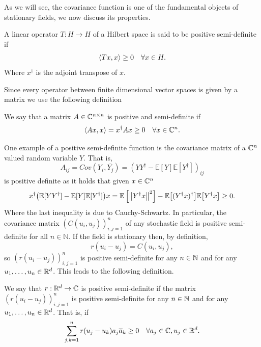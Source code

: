 \documentclass[
    a4paper,
    DIV=14,
    abstract=true,
    numbers=noenddot
]{scrartcl}
\begin{document}
As we will see, the covariance function is one of the fundamental objects of stationary fields, we now discuss its properties.
\begin{definition}
	A linear operator $T: H\to H$ of a Hilbert space is said to be positive semi-definite if
	\begin{equation*}
		\left\langle Tx,x\right\rangle\geq 0 \quad\forall x \in H.
	\end{equation*}
	Where $x^\dagger$ is the adjoint transpose of $x$.
\end{definition}
Since every operator between finite dimensional vector spaces is given by a matrix we use the following definition
\begin{definition}
	We say that a matrix $A \in \mathbb{C}^{n\times n}$ is positive and semi-definite if
	\begin{equation*}
		\left\langle Ax,x\right\rangle=x^\dagger Ax\geq 0\quad\forall x \in \mathbb{C}^n.
	\end{equation*}
\end{definition}
One example of a positive semi-definite function is the covariance matrix of a $\mathbb{C}^n$ valued random variable  $Y$. That is, $$A_{ij}=Cov(Y_i,\overline{Y_j})=(YY^\dagger-\mathbb{E}[Y]\mathbb{E}[Y^\dagger])_{ij}$$ is positive definite as it holds that given $x\in \mathbb{C}^n$
\begin{equation*}
	x^\dagger\qty(\mathbb{E}[YY^\dagger]-\mathbb{E}[Y]\mathbb{E}[Y^\dagger])x=\mathbb{E}\left[\left\lVert Y^\dagger x \right\rVert^2\right]-\mathbb{E}\qty[(Y^\dagger x)^\dagger]\mathbb{E}\qty[Y^\dagger x]\geq 0.
\end{equation*}
Where the last inequality is due to Cauchy-Schwartz.
In particular, the covariance matrix $(C(u_i,u_j))_{i,j=1}^n$ of any stochastic field is positive semi-definite for all $n\in\mathbb{N}$. If the field is stationary then, by definition,
$$r(u_i-u_j)=C(u_i,u_j),$$
so $(r(u_i-u_j))_{i,j=1}^n$ is positive semi-definite for any  $n\in\mathbb{N}$ and for any $u_1,\ldots,u_n \in \mathbb{R}^d$.
This leads to the following definition.
\begin{definition}
	We say that $r:\mathbb{R}^d\to \mathbb{C}$ is positive semi-definite if the matrix  $(r(u_i-u_j))_{i,j=1}^n$ is positive semi-definite for any  $n\in\mathbb{N}$ and for any $u_1,\ldots,u_n \in \mathbb{R}^d$. That is, if
	\begin{equation*}
		\sum_{j,k=1}^{n} r(u_j-u_k)a_j\overline{a}_k\geq 0 \quad\forall a_j \in \mathbb{C}, u_j\in \mathbb{R}^d.
	\end{equation*}
\end{definition}
\end{document}
